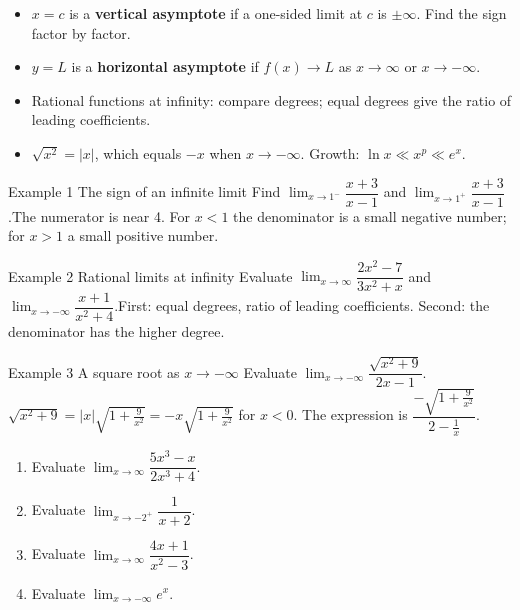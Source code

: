 \documentclass[11pt]{article}
\begin{document}

\begin{ideabox}
\begin{itemize}[leftmargin=*,itemsep=2pt,topsep=2pt]
  \item $x=c$ is a \textbf{vertical asymptote} if a one-sided limit at $c$ is $\pm\infty$. Find the sign factor by factor.
  \item $y=L$ is a \textbf{horizontal asymptote} if $f(x)\to L$ as $x\to\infty$ or $x\to-\infty$.
  \item Rational functions at infinity: compare degrees; equal degrees give the ratio of leading coefficients.
  \item $\sqrt{x^2}=|x|$, which equals $-x$ when $x\to-\infty$. Growth: $\ln x\ll x^p\ll e^x$.
\end{itemize}
\end{ideabox}

\begin{example}{Example 1 \textperiodcentered{} The sign of an infinite limit}
Find $\displaystyle\lim_{x\to 1^-}\dfrac{x+3}{x-1}$ and $\displaystyle\lim_{x\to 1^+}\dfrac{x+3}{x-1}$.\soln The numerator is near 4. For $x<1$ the denominator is a small negative number; for $x>1$ a small positive number.
\end{example}

\begin{example}{Example 2 \textperiodcentered{} Rational limits at infinity}
Evaluate $\displaystyle\lim_{x\to \infty}\dfrac{2x^2-7}{3x^2+x}$ and $\displaystyle\lim_{x\to -\infty}\dfrac{x+1}{x^2+4}$.\soln First: equal degrees, ratio of leading coefficients. Second: the denominator has the higher degree.
\end{example}

\begin{example}{Example 3 \textperiodcentered{} A square root as $x\to-\infty$}
Evaluate $\displaystyle\lim_{x\to -\infty}\dfrac{\sqrt{x^2+9}}{2x-1}$.\soln $\sqrt{x^2+9}=|x|\sqrt{1+\tfrac{9}{x^2}}=-x\sqrt{1+\tfrac9{x^2}}$ for $x<0$. The expression is $\dfrac{-\sqrt{1+\frac9{x^2}}}{2-\frac1x}$.
\end{example}

\newpage
{}

\begin{enumerate}[leftmargin=*,itemsep=2pt]
  \item Evaluate $\displaystyle\lim_{x\to \infty}\dfrac{5x^3-x}{2x^3+4}$.\work{2.3cm}
  \item Evaluate $\displaystyle\lim_{x\to -2^+}\dfrac{1}{x+2}$.\work{2.3cm}
  \item Evaluate $\displaystyle\lim_{x\to \infty}\dfrac{4x+1}{x^2-3}$.\work{2.3cm}
  \item Evaluate $\displaystyle\lim_{x\to -\infty}e^x$.\work{2.3cm}
\end{enumerate}
\end{document}
